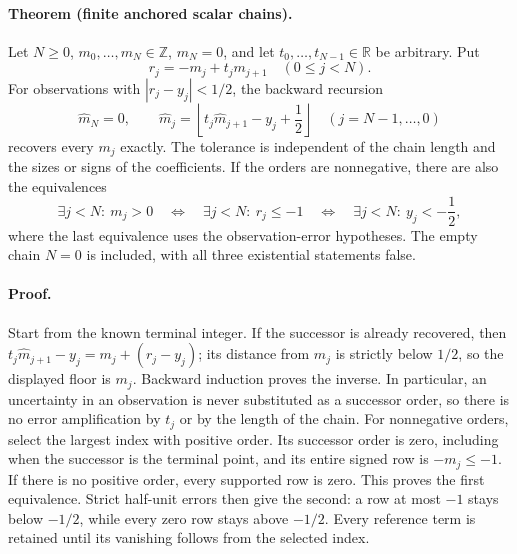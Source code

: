 \paragraph{Theorem (finite anchored scalar chains).}
Let \(N\ge0\), \(m_0,\ldots,m_N\in\mathbb Z\), \(m_N=0\), and let
\(t_0,\ldots,t_{N-1}\in\mathbb R\) be arbitrary. Put
\[
 r_j=-m_j+t_jm_{j+1}\quad(0\le j<N).
\]
For observations with \(|r_j-y_j|<1/2\), the backward recursion
\[
 \widehat m_N=0,\qquad
 \widehat m_j=\left\lfloor t_j\widehat m_{j+1}-y_j+\frac12\right\rfloor
 \quad(j=N-1,\ldots,0)
\]
recovers every \(m_j\) exactly. The tolerance is independent of the chain
length and the sizes or signs of the coefficients. If the orders are
nonnegative, there are also the equivalences
\begin{equation}
 \exists j<N:\ m_j>0
 \quad\Longleftrightarrow\quad \exists j<N:\ r_j\le-1
 \quad\Longleftrightarrow\quad \exists j<N:\ y_j<-\frac12,
 \label{eq:anchored-chain-sign}
\end{equation}
where the last equivalence uses the observation-error hypotheses. The empty
chain \(N=0\) is included, with all three existential statements false.

\paragraph{Proof.}
Start from the known terminal integer. If the successor is already recovered,
then \(t_j\widehat m_{j+1}-y_j=m_j+(r_j-y_j)\); its distance from \(m_j\)
is strictly below \(1/2\), so the displayed floor is \(m_j\). Backward
induction proves the inverse. In particular, an uncertainty in an observation
is never substituted as a successor order, so there is no error amplification
by \(t_j\) or by the length of the chain.
For nonnegative orders, select the largest index with positive order. Its
successor order is zero, including when the successor is the terminal point,
and its entire signed row is \(-m_j\le-1\). If there is no positive order,
every supported row is zero. This proves the first equivalence. Strict
half-unit errors then give the second: a row at most \(-1\) stays below
\(-1/2\), while every zero row stays above \(-1/2\). Every reference term
is retained until its vanishing follows from the selected index.

